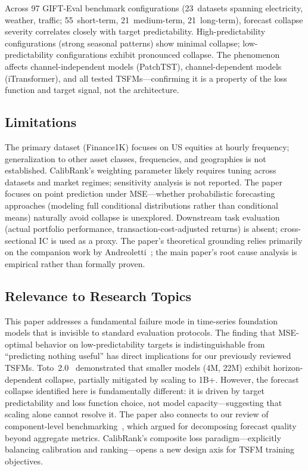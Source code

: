 \documentclass[11pt,a4paper]{article}
\begin{document}
Across 97 GIFT-Eval benchmark configurations (23~datasets spanning electricity, weather, traffic; 55~short-term, 21~medium-term, 21~long-term), forecast collapse severity correlates closely with target predictability. High-predictability configurations (strong seasonal patterns) show minimal collapse; low-predictability configurations exhibit pronounced collapse. The phenomenon affects channel-independent models (PatchTST), channel-dependent models (iTransformer), and all tested TSFMs---confirming it is a property of the loss function and target signal, not the architecture.

\subsection{Limitations}

The primary dataset (Finance1K) focuses on US equities at hourly frequency; generalization to other asset classes, frequencies, and geographies is not established. CalibRank's weighting parameter likely requires tuning across datasets and market regimes; sensitivity analysis is not reported. The paper focuses on point prediction under MSE---whether probabilistic forecasting approaches (modeling full conditional distributions rather than conditional means) naturally avoid collapse is unexplored. Downstream task evaluation (actual portfolio performance, transaction-cost-adjusted returns) is absent; cross-sectional IC is used as a proxy. The paper's theoretical grounding relies primarily on the companion work by Andreoletti~\cite{andreoletti2026}; the main paper's root cause analysis is empirical rather than formally proven.

\subsection{Relevance to Research Topics}

This paper addresses a fundamental failure mode in time-series foundation models that is invisible to standard evaluation protocols. The finding that MSE-optimal behavior on low-predictability targets is indistinguishable from ``predicting nothing useful'' has direct implications for our previously reviewed TSFMs. Toto~2.0~\cite{toto2026} demonstrated that smaller models (4M, 22M) exhibit horizon-dependent collapse, partially mitigated by scaling to 1B+. However, the forecast collapse identified here is fundamentally different: it is driven by target predictability and loss function choice, not model capacity---suggesting that scaling alone cannot resolve it. The paper also connects to our review of component-level benchmarking~\cite{compbench2026}, which argued for decomposing forecast quality beyond aggregate metrics. CalibRank's composite loss paradigm---explicitly balancing calibration and ranking---opens a new design axis for TSFM training objectives.
\end{document}
